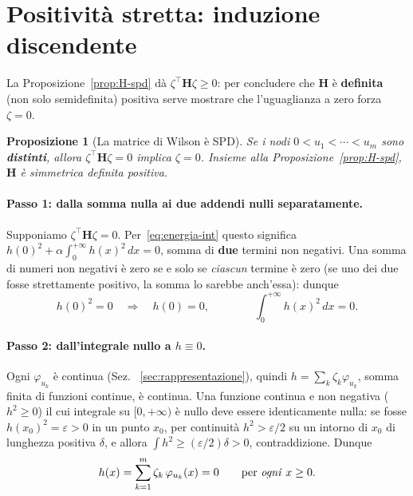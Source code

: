 \documentclass[11pt,a4paper]{article}
\theoremstyle{plain}
\newtheorem{proposizione}[teorema]{Proposizione}
\theoremstyle{definition}
\theoremstyle{remark}
\newcommand{\Hmat}{\mathbf{H}}
\newcommand{\transp}{^{\!\top}}
\begin{document}
\section{Positività stretta: induzione discendente}
\label{sec:stretta}

La Proposizione~\ref{prop:H-spd} dà $\zeta\transp\Hmat\zeta\ge 0$: per concludere che $\Hmat$ è
\textbf{definita} (non solo semidefinita) positiva serve mostrare che l'uguaglianza a zero
forza $\zeta=0$.

\begin{proposizione}[La matrice di Wilson è SPD]
\label{prop:H-spd-stretta}
Se i nodi $0<u_1<\cdots<u_m$ sono \textbf{distinti}, allora $\zeta\transp\Hmat\zeta=0$ implica
$\zeta=0$. Insieme alla Proposizione~\ref{prop:H-spd}, $\Hmat$ è simmetrica definita positiva.
\end{proposizione}

\paragraph{Passo 1: dalla somma nulla ai due addendi nulli separatamente.} Supponiamo
$\zeta\transp\Hmat\zeta=0$. Per~\eqref{eq:energia-int} questo significa
$h(0)^2+\alpha\int_0^{+\infty}h(x)^2\,dx=0$, somma di \textbf{due} termini non negativi. Una
somma di numeri non negativi è zero se e solo se \emph{ciascun} termine è zero (se uno dei due
fosse strettamente positivo, la somma lo sarebbe anch'essa): dunque
\[
  h(0)^2=0 \quad\Longrightarrow\quad h(0)=0,
  \qquad\qquad
  \int_0^{+\infty}h(x)^2\,dx = 0 .
\]

\paragraph{Passo 2: dall'integrale nullo a $h\equiv 0$.} Ogni $\varphi_{u_k}$ è continua (Sez.~
\ref{sec:rappresentazione}), quindi $h=\sum_k\zeta_k\varphi_{u_k}$, somma finita di funzioni
continue, è continua. Una funzione continua e non negativa ($h^2\ge 0$) il cui integrale su
$[0,+\infty)$ è nullo deve essere identicamente nulla: se fosse $h(x_0)^2=\varepsilon>0$ in un
punto $x_0$, per continuità $h^2>\varepsilon/2$ su un intorno di $x_0$ di lunghezza positiva
$\delta$, e allora $\int h^2 \ge (\varepsilon/2)\delta>0$, contraddizione. Dunque
\begin{equation}
  h(x) = \sum_{k=1}^m \zeta_k\,\varphi_{u_k}(x) = 0 \qquad \text{per \emph{ogni} } x\ge 0.
  \label{eq:h-zero}
\end{equation}
\end{document}
